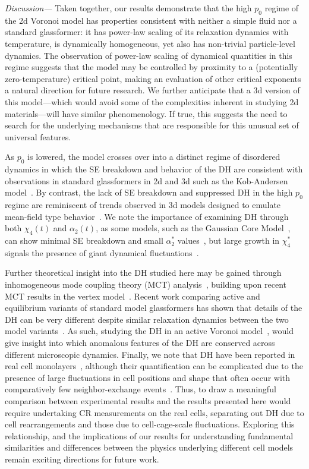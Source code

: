 \documentclass[amsmath,amssymb,prl,reprint,twocolumn]{revtex4-2}
\begin{document}
\emph{Discussion---} Taken together, our results demonstrate that the high $p_0$ regime of the 2d Voronoi model has properties consistent with neither a simple fluid nor a standard glassformer:
it has power-law scaling of its relaxation dynamics with temperature, is dynamically homogeneous, yet also has non-trivial particle-level dynamics.
The observation of power-law scaling of dynamical quantities in this regime suggests that the model may be controlled by proximity to a (potentially zero-temperature) critical point, making an evaluation of other critical exponents a natural direction for future research.
We further anticipate that a 3d version of this model---which would avoid some of the complexities inherent in studying 2d materials---will have similar phenomenology. If true, this suggests the need to search for the underlying mechanisms that are responsible for this unusual set of universal features.

As $p_0$ is lowered, the model crosses over into a distinct regime of disordered dynamics in which the SE breakdown and behavior of the DH are consistent with observations in standard glassformers in 2d and 3d such as the Kob-Andersen model~\cite{Kob1997,Ikeda2011PRL,Sengupta2013,Shiba2019}.
By contrast, the lack of SE breakdown and suppressed DH in the high $p_0$ regime are reminiscent of trends observed in 3d models designed to emulate mean-field type behavior~\cite{Mari2011,Nandi2021}.
We note the importance of examining DH through both $\chi_4(t)$ and $\alpha_2(t)$, as some models, such as the Gaussian Core Model~\cite{Stillinger1976,Stillinger1979PRB,Stillinger1979JChemPhys}, can show minimal SE breakdown and small $\alpha_2^*$ values~\cite{Ikeda2011PRL}, but large growth in $\chi_4^*$ signals the presence of giant dynamical fluctuations~\cite{Coslovich2016}.


Further theoretical insight into the DH studied here may be gained through inhomogeneous mode coupling theory (MCT) analysis~\cite{Biroli2006}, building upon recent MCT results in the vertex model~\cite{Pandey2025}.
Recent work comparing active and equilibrium variants of standard model glassformers has shown that details of the DH can be very different despite similar relaxation dynamics between the two model variants~\cite{Paul2023}.
As such, studying the DH in an active Voronoi model~\cite{Bi2016}, would give insight into which anomalous features of the DH are conserved across different microscopic dynamics.
Finally, we note that DH have been reported in real cell monolayers~\cite{Angelini2011,Malinverno2017,Vishwakarma2020,Cerbino2021}, although their quantification can be complicated due to the presence of large fluctuations in cell positions and shape that often occur with comparatively few neighbor-exchange events~\cite{Angelini2011}.
Thus, to draw a meaningful comparison between experimental results and the results presented here would require undertaking CR measurements on the real cells, separating out DH due to cell rearrangements and those due to cell-cage-scale fluctuations.
Exploring this relationship, and the implications of our results for understanding fundamental similarities and differences between the physics underlying different cell models remain exciting directions for future work.
\end{document}
